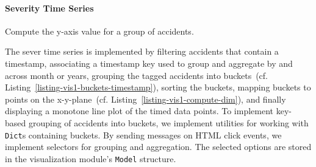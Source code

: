 \paragraph{Severity Time Series}
\begin{listing}
    
    \caption{Function to group accidents into buckets based on their \lstinline{Posix} timestamps.}
    \label{listing-vis1-buckets-timestamp}
\end{listing}
\begin{listing}
    
    \caption{Compute the y-axis value for a group of accidents.}
    \label{listing-vis1-compute-dim}
\end{listing}
The sever time series is implemented by \Ni filtering accidents that contain a timestamp, \Nii associating a timestamp key used to group and aggregate by and across month or years, \Niii grouping the tagged accidents into buckets~(cf. Listing~\ref{listing-vis1-buckets-timestamp}), \Niv sorting the buckets, \Nv mapping buckets to points on the x-y-plane~(cf. Listing~\ref{listing-vis1-compute-dim}), and finally displaying a monotone line plot of the timed data points.
To implement key-based grouping of accidents into buckets, we implement utilities for working with \lstinline{Dict}s containing buckets. By sending messages on HTML click events, we implement selectors for grouping and aggregation. The selected options are stored in the visualization module's \lstinline{Model} structure.

